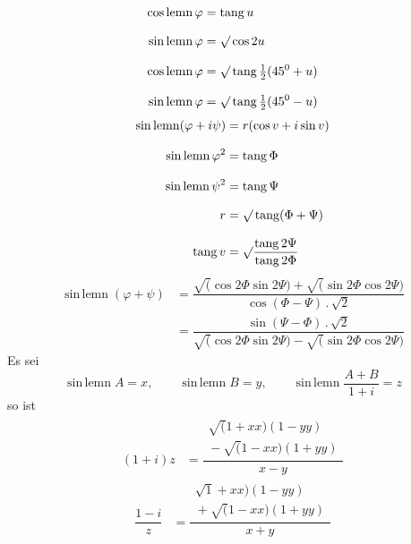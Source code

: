 \[
\begin{aligned}
\operatorname{cos\,lemn}\varphi&=\operatorname{tang}u\\[8pt]
\operatorname{sin\,lemn}\varphi&=\surd\cos2u\\[8pt]
\operatorname{cos\,lemn}\varphi&=\surd\operatorname{tang}\tfrac12(45^0+u)\\[8pt]
\operatorname{sin\,lemn}\varphi&=\surd\operatorname{tang}\tfrac12(45^0-u)
\end{aligned}
\]
\[
\begin{aligned}
\operatorname{sin\,lemn}(\varphi+i\psi)&=r(\cos v+i\sin v)\\[8pt]
\operatorname{sin\,lemn}\varphi^2&=\operatorname{tang}\Phi\\[8pt]
\operatorname{sin\,lemn}\psi^2&=\operatorname{tang}\Psi\\[8pt]
r&=\surd\operatorname{tang}(\Phi+\Psi)\\[8pt]
\operatorname{tang}v&=\surd\dfrac{\operatorname{tang}2\Psi}{\operatorname{tang}2\Phi}
\end{aligned}
\]
\[
\begin{aligned}
\operatorname{sin\,lemn}(\varphi+\psi)
&=\dfrac{\surd(\cos2\Phi\sin2\Psi)+\surd(\sin2\Phi\cos2\Psi)}{\cos(\Phi-\Psi)\, .\,\surd2}\\[8pt]
&=\dfrac{\sin(\Psi-\Phi)\, .\,\surd2}{\surd(\cos2\Phi\sin2\Psi)-\surd(\sin2\Phi\cos2\Psi)}
\end{aligned}
\]
Es sei
\[
\operatorname{sin\,lemn}A=x,\qquad
\operatorname{sin\,lemn}B=y,\qquad
\operatorname{sin\,lemn}\dfrac{A+B}{1+i}=z
\]
so ist
\[
\begin{aligned}(1+i)z&=\dfrac{\begin{gathered}\surd(1+xx)(1-yy)\\[3pt]{}-\surd(1-xx)(1+yy)\end{gathered}}{x-y}\end{aligned}
\]
\[
\begin{aligned}\dfrac{1-i}{z}&=\dfrac{\begin{gathered}\surd1+xx)(1-yy)\\[3pt]{}+\surd(1-xx)(1+yy)\end{gathered}}{x+y}\end{aligned}
\]
